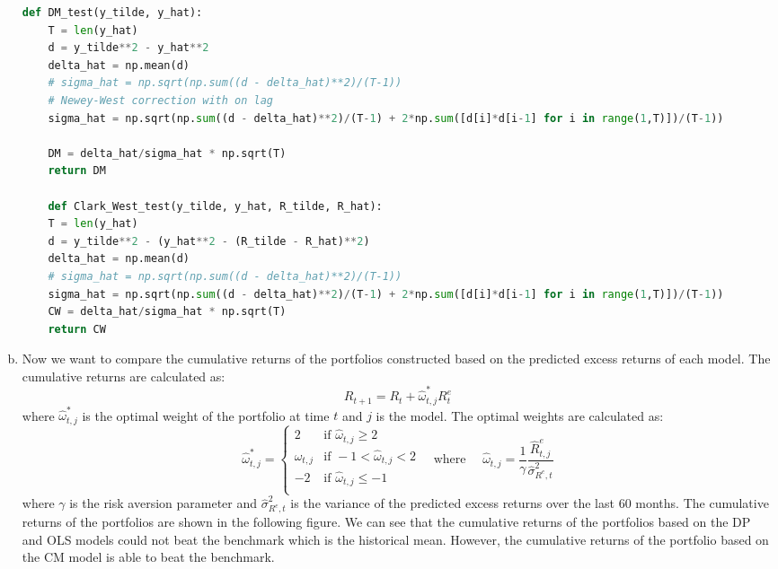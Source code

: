 \begin{enumerate}[(a)]
    \begin{lstlisting}[language=Python, caption=Python code for Diebold-Mariano test, label={lst:q1a}, escapechar=|, frame=single, basicstyle=\small, showstringspaces=false, captionpos=b, breaklines=true, showspaces=false, showtabs=false, keywordstyle=\color{blue}, commentstyle=\color{gray}]
        def DM_test(y_tilde, y_hat):
    T = len(y_hat)
    d = y_tilde**2 - y_hat**2
    delta_hat = np.mean(d)
    # sigma_hat = np.sqrt(np.sum((d - delta_hat)**2)/(T-1))
    # Newey-West correction with on lag
    sigma_hat = np.sqrt(np.sum((d - delta_hat)**2)/(T-1) + 2*np.sum([d[i]*d[i-1] for i in range(1,T)])/(T-1))

    DM = delta_hat/sigma_hat * np.sqrt(T)
    return DM

    def Clark_West_test(y_tilde, y_hat, R_tilde, R_hat):
    T = len(y_hat)
    d = y_tilde**2 - (y_hat**2 - (R_tilde - R_hat)**2)
    delta_hat = np.mean(d)
    # sigma_hat = np.sqrt(np.sum((d - delta_hat)**2)/(T-1))
    sigma_hat = np.sqrt(np.sum((d - delta_hat)**2)/(T-1) + 2*np.sum([d[i]*d[i-1] for i in range(1,T)])/(T-1))
    CW = delta_hat/sigma_hat * np.sqrt(T)
    return CW
    \end{lstlisting}

    \item Now we want to compare the cumulative returns of the portfolios constructed based on the predicted excess returns of each model. The cumulative returns are calculated as:
    \begin{equation*}
        R_{t+1} = R_{t} + \hat{\omega}_{t,j}^*R_{t}^e
    \end{equation*}
    where $\hat{\omega}_{t,j}^*$ is the optimal weight of the portfolio at time $t$ and $j$ is the model. The optimal weights are calculated as:
    \begin{equation*}
        \hat{\omega}_{t,j}^* = \begin{cases}
            2 & \text{if } \hat{\omega}_{t,j} \geq 2\\
            \hat{\omega}_{t,j} & \text{if } -1 < \hat{\omega}_{t,j} < 2\\
            -2 & \text{if } \hat{\omega}_{t,j} \leq -1\\
        \end{cases} \quad \text{where } \quad \hat{\omega}_{t,j} = \frac{1}{\gamma}\dfrac{\hat{R}^e_{t,j}}{\hat{\sigma}^2_{R^e,t}}
    \end{equation*}
    where $\gamma$ is the risk aversion parameter and $\hat{\sigma}^2_{R^e,t}$ is the variance of the predicted excess returns over the last 60 months. The cumulative returns of the portfolios are shown in the following figure. We can see that the cumulative returns of the portfolios based on the DP and OLS models could not beat the benchmark which is the historical mean. However, the cumulative returns of the portfolio based on the CM model is able to beat the benchmark.


\end{enumerate}
